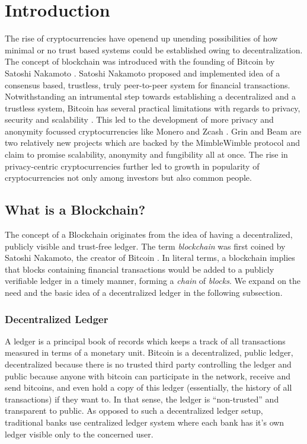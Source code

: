 
\newcommand{\etas}{\ensuremath{\eta_{\mathrm{s}}}}


\chapter{Introduction}

The rise of cryptocurrencies have openend up unending possibilities of how minimal or no trust based systems could be established owing to decentralization.
The concept of blockchain was introduced with the founding of Bitcoin by Satoshi Nakamoto \cite{Nakamoto2009}.
Satoshi Nakamoto proposed and implemented idea of a consensus based, trustless, truly peer-to-peer system for financial transactions.  
Notwithstanding an intrumental step towards establishing a decentralized and a trustless system, Bitcoin has several practical limitations with regards to privacy, security and scalability \cite{Conti2018}.   
This led to the development of more privacy and anonymity focussed cryptocurrencies like Monero \cite{Saberhagen2013} and Zcash \cite{Sasson2014}.
Grin \cite{GrinWebsite} and Beam \cite{BeamWebsite} are two relatively new projects which are backed by the MimbleWimble protocol \cite{Poelstra2016} and claim to promise scalability, anonymity and fungibility all at once.
The rise in privacy-centric cryptocurrencies further led to growth in popularity of cryptocurrencies not only among investors but also common people.


\section{What is a Blockchain?}
\label{scn:blockchain}

The concept of a Blockchain originates from the idea of having a decentralized, publicly visible and trust-free ledger.
The term \textit{blockchain} was first coined by Satoshi Nakamoto, the creator of Bitcoin \cite{Nakamoto2009}.
In literal terms, a blockchain implies that blocks containing financial transactions would be added to a publicly verifiable ledger in a timely manner, forming a \textit{chain} of \textit{blocks}.
We expand on the need and the basic idea of a decentralized ledger in the following subsection.

\subsection{Decentralized Ledger}

A ledger is a principal book of records which keeps a track of all transactions measured in terms of a monetary unit. Bitcoin is a decentralized, public ledger, decentralized because there is no trusted third party controlling the ledger and public because anyone with bitcoin can participate in the network, receive and send bitcoins, and even hold a copy of this ledger (essentially, the history of all transactions) if they want to. In that sense, the ledger is ``non-trusted'' and transparent to public. As opposed to such a decentralized ledger setup, traditional banks use centralized ledger system where each bank has it's own ledger visible only to the concerned user.\\ 

